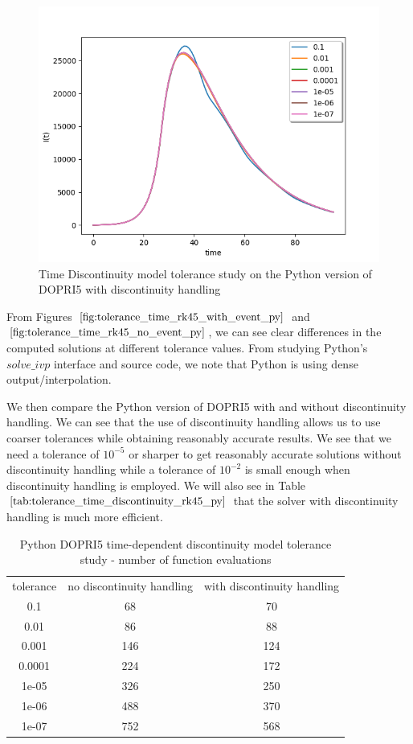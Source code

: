 \begin{figure}[H]
\centering
\includegraphics[width=0.7\linewidth]{./figures/tolerance_time_rk45_with_event_py}
\caption{Time Discontinuity model tolerance study on the Python version of DOPRI5 with discontinuity handling}
\label{fig:tolerance_time_rk45_with_event_py}
\end{figure}

From Figures $\ref{fig:tolerance_time_rk45_with_event_py}$ and $\ref{fig:tolerance_time_rk45_no_event_py}$, we can see clear differences in the computed solutions at different tolerance values. From studying Python's $solve\_ivp$ interface and source code, we note that Python is using dense output/interpolation.

We then compare the Python version of DOPRI5 with and without discontinuity handling. We can see that the use of discontinuity handling allows us to use coarser tolerances while obtaining reasonably accurate results. We see that we need a tolerance of $10^{-5}$ or sharper to get reasonably accurate solutions without discontinuity handling while a tolerance of $10^{-2}$ is small enough when discontinuity handling is employed. We will also see in Table $\ref{tab:tolerance_time_discontinuity_rk45_py}$ that the solver with discontinuity handling is much more efficient.


\begin{table}[H]
\caption {Python DOPRI5 time-dependent discontinuity model tolerance study - number of function evaluations} \label{tab:tolerance_time_discontinuity_rk45_py} 
\begin{center}
\begin{tabular}{ c c c }
tolerance & no discontinuity handling & with discontinuity handling \\ 
0.1 & 68 & 70 \\
0.01 & 86 & 88 \\
0.001 & 146 & 124 \\
0.0001& 224 & 172 \\
1e-05 & 326 & 250 \\
1e-06 & 488 & 370 \\
1e-07 & 752 & 568 \\
\end{tabular}
\end{center}
\end{table}

